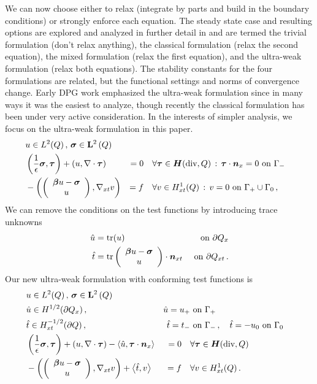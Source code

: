 \documentclass{article}
\begin{document}
We can now choose either to relax (integrate by parts and build in the boundary conditions) or strongly enforce each equation. 
The steady state case and resulting options are explored and analyzed in further detail in \cite{VariousVariational} 
and are termed the trivial formulation (don't relax anything), the classical formulation (relax the second equation), 
the mixed formulation (relax the first equation), and the ultra-weak formulation (relax both equations).
The stability constants for the four formulations are related, but the functional settings and norms of convergence change.
Early DPG work emphasized the ultra-weak formulation since in many ways it was the easiest to analyze, 
though recently the classical formulation has been under very active consideration.
In the interests of simpler analysis, we focus on the ultra-weak formulation in this paper.
\begin{equation}
\label{eq:confusionUltraWeakBF}
	\begin{aligned}
		&u\in L^2(Q)\,,\,\boldsymbol\sigma\in\mathbf{L}^2\left( Q \right)\\
		&\left( \frac{1}{\epsilon}\boldsymbol\sigma,\boldsymbol\tau \right)+\left( u,\nabla\cdot\boldsymbol\tau \right)&=0\quad&\forall\boldsymbol\tau\in\mbox{\boldmath $H$}(\text{div},Q)\,:\,\boldsymbol\tau\cdot\boldsymbol n_x=0\text{ on }\Gamma_-\\
		&-\left( \left( \begin{array}{c} \boldsymbol\beta u-\boldsymbol\sigma\\ u\\ \end{array} \right),\nabla_{xt} v \right)&=f\quad&\forall v\in H^1_{xt}(Q)\,:\,v=0\text{ on }\Gamma_+\cup\Gamma_0\,,
	\end{aligned}
\end{equation}
We can remove the conditions on the test functions by introducing trace unknowns 
\begin{align*}
\hat u&=\operatorname*{tr}(u)&\text{ on }\partial Q_x\\
\hat t&=\operatorname*{tr}\left( \begin{array}{c} \boldsymbol\beta u-\boldsymbol\sigma\\ u\\ \end{array} \right)\cdot\boldsymbol n_{xt}&\text{ on }\partial Q_{xt}\,.
\end{align*}
Our new ultra-weak formulation with conforming test functions is
\begin{equation}
\label{eq:confusionUltraWeakContinuousBF}
	\begin{aligned}
		&u\in L^2(Q)\,,\,\boldsymbol\sigma\in\mathbf{L}^2\left( Q \right)\\
		&\hat u\in H^{1/2}(\partial Q_x)\,,\,&\hat u=u_+&\text{ on }\Gamma_+\\
		&\hat t\in H^{-1/2}_{xt}(\partial Q)\,,\,&\hat t=t_-&\text{ on }\Gamma_-\,,\quad\hat t=-u_0\text{ on }\Gamma_0\\
		&\left( \frac{1}{\epsilon}\boldsymbol\sigma,\boldsymbol\tau \right)+\left( u,\nabla\cdot\boldsymbol\tau \right)-\left\langle \hat u,\boldsymbol\tau\cdot\boldsymbol n_x \right\rangle&=0\quad&\forall\boldsymbol\tau\in\mbox{\boldmath $H$}(\text{div},Q)\\
		&-\left( \left( \begin{array}{c} \boldsymbol\beta u-\boldsymbol\sigma\\ u\\ \end{array} \right),\nabla_{xt} v \right)+\left\langle \hat t,v \right\rangle&=f\quad&\forall v\in H^1_{xt}(Q)\,.
	\end{aligned}
\end{equation}
\end{document}
